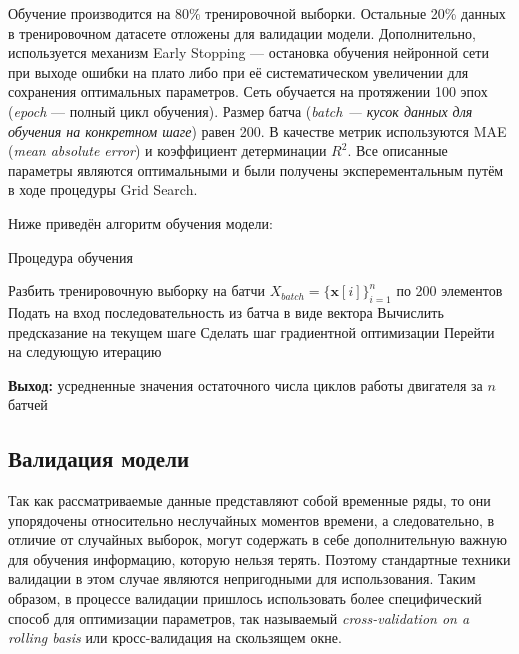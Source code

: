 \documentclass[14pt]{extarticle}
\begin{document}
Обучение производится на 80\% тренировочной выборки. Остальные 20\% данных в тренировочном датасете отложены для валидации модели. Дополнительно, используется механизм Early Stopping --- остановка обучения нейронной сети при выходе ошибки на плато либо при её систематическом увеличении для сохранения оптимальных параметров. Сеть обучается на протяжении 100 эпох ({\it epoch} --- полный цикл обучения). Размер батча ({\it batch --- кусок данных для обучения на конкретном шаге}) равен 200. В качестве метрик используются MAE ({\it mean absolute error}) и коэффициент детерминации $R^2$. Все описанные параметры являются оптимальными и были получены эксперементальным путём в ходе процедуры Grid Search.

Ниже приведён алгоритм обучения модели:

\begin{algorithm}[H]
	\caption{{Процедура обучения}}
	
	\begin{algorithmic}[1]
		\STATE Разбить тренировочную выборку на батчи $X_{batch} = \{\textbf{x}[i]\}_{i = 1}^{n}$ по 200 элементов
		\STATE Подать на вход последовательность из батча в виде вектора
		\STATE Вычислить предсказание на текущем шаге
		\STATE Сделать шаг градиентной оптимизации
		\STATE Перейти на следующую итерацию
		\ENDFOR
		
		\hspace*{\algorithmicindent} \textbf{Выход:} усредненные значения остаточного числа циклов работы двигателя за $n$ батчей
	\end{algorithmic}
\end{algorithm}

\subsection{Валидация модели}

Так как рассматриваемые данные представляют собой временные ряды, то они упорядочены относительно неслучайных моментов времени, а следовательно, в отличие от случайных выборок, могут содержать в себе дополнительную важную для обучения информацию, которую нельзя терять. Поэтому стандартные техники валидации в этом случае являются непригодными для использования. Таким образом, в процессе валидации пришлось использовать более специфический способ для оптимизации параметров, так называемый {\it cross-validation on a rolling basis} или кросс-валидация на скользящем окне. 
\end{document}

